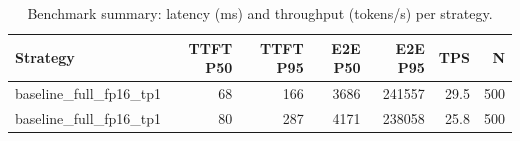 \begin{table}
\caption{Benchmark summary: latency (ms) and throughput (tokens/s) per strategy.}
\label{tab:summary}
\begin{tabular}{lrrrrrr}
\toprule
Strategy & TTFT P50 & TTFT P95 & E2E P50 & E2E P95 & TPS & N \\
\midrule
baseline_full_fp16_tp1 & 68 & 166 & 3686 & 241557 & 29.5 & 500 \\
baseline_full_fp16_tp1 & 80 & 287 & 4171 & 238058 & 25.8 & 500 \\
\bottomrule
\end{tabular}
\end{table}

